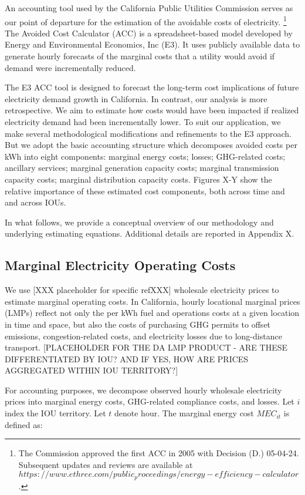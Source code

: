 \documentclass[11pt]{article}
\begin{document}
An accounting tool used by the California Public Utilities Commission serves as our point of departure for the estimation of the avoidable costs of electricity. \footnote{The Commission approved the first ACC in 2005 with Decision (D.) 05-04-24. Subsequent updates and reviews are available at $https://www.ethree.com/public_proceedings/energy-efficiency-calculator$.}  The Avoided Cost Calculator (ACC) is a spreadsheet-based model developed by Energy and Environmental Economics, Inc (E3).  It uses publicly available data to generate hourly forecasts of the marginal costs that a utility would avoid if demand were incrementally reduced. 

The E3 ACC tool is designed to forecast the long-term cost implications of future electricity  demand growth in California. In contrast, our analysis is more retrospective. We aim to estimate how costs would have been impacted if realized electricity demand had been incrementally lower. To suit our application, we make several methodological modifications and refinements to the E3 approach. But we adopt the basic accounting structure which decomposes avoided costs per kWh into eight components: marginal energy costs; losses; GHG-related costs; ancillary services; marginal generation capacity costs; marginal transmission capacity costs; marginal distribution capacity costs. Figures X-Y show the relative importance of these estimated cost components, both across time and and across IOUs. 

In what follows, we provide a conceptual overview of our methodology and underlying estimating equations. Additional details are reported in Appendix X.

\subsection{Marginal Electricity Operating Costs}

We use [XXX placeholder for specific refXXX] wholesale electricity prices to estimate  marginal operating costs.  In California, hourly locational marginal prices (LMPs) reflect not only the per kWh fuel and operations costs at a given location in time and space, but also the costs of purchasing GHG permits to offset emissions, congestion-related costs, and electricity losses due to long-distance transport.   [PLACEHOLDER FOR THE DA LMP PRODUCT - ARE THESE DIFFERENTIATED BY IOU? AND IF YES, HOW ARE PRICES AGGREGATED WITHIN IOU TERRITORY?]  

For accounting purposes, we decompose observed hourly wholesale electricity prices  into marginal energy costs, GHG-related compliance costs, and losses. Let $i$ index the IOU territory. Let $t$ denote hour. The marginal energy cost $MEC_{it}$  is  defined as: 
\end{document}
